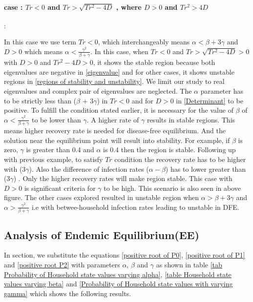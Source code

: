 \documentclass[paper=a4, fontsize=11pt, twoside, BCOR=12mm, parskip=full, listof=totoc]{scrreprt}
\begin{document}
{\paragraph*{case : $ Tr < 0$ and $Tr > \sqrt{Tr^2-4D} $ , where  $D > 0$ and $Tr^2 > 4D $}:

In this case we use term $ Tr < 0 $, which interchangeably means \( \alpha < \beta + 3\gamma \) and $ D > 0 $ which means \( \alpha < \frac{\gamma^2}{\beta + \gamma} \). In this case, when $ Tr < 0 $ and $Tr > \sqrt{Tr^2-4D} > 0$ with $D > 0$ and $ Tr^2-4D > 0 $, it shows the stable region because both eigenvalues   are negative in \ref{eigenvalue} and for other cases, it shows unstable regions in \ref{regions of stability and unstability}. We limit our study to real eigenvalues and complex pair of eigenvalues are neglected. The $\alpha$ parameter has to be strictly less than ($\beta$ + $3\gamma$) in $ Tr < 0$ and for $D > 0$ in \ref{Determinant} to be positive. To fulfill the condition stated earlier, it is necessary for the value of $\beta$  of \( \alpha < \frac{\gamma^2}{\beta + \gamma} \) to be lower than $\gamma$. A higher rate of $\gamma$ results in stable regions. This means higher recovery rate is needed for disease-free equilibrium. And the solution near the equilibrium point 
will result into stability. For example, if $\beta$ is zero, $\gamma$ is greater than 0.4 and $\alpha$ is 0.4 then the region is stable. Following up with previous example, to satisfy $Tr$ condition the recovery rate has to be higher with (3$\gamma$). Also the difference of infection rates ($\alpha - \beta$) has to lower greater than (3$\gamma$) . Only the higher recovery rates will make region stable. This case with $D > 0$ is significant criteria for $\gamma$ to be high. This scenario is also seen in above figure. 
The other cases explored resulted in unstable region when \( \alpha > \beta + 3\gamma \) and \( \alpha > \frac{\gamma^2}{\beta + \gamma} \) i.e with betwee-household infection rates leading to unstable in DFE.  

\subsection{Analysis of Endemic Equilibrium(EE)}
In section, we substitute the equations \ref{positive root of P0}, \ref{positive root of P1} and \ref{positive root P2} with parameters $\alpha$, $\beta$ and $\gamma$ as shown in table \ref{tab Probability of Household state values varying alpha}, \ref{table Household state values varying beta} and \ref{Probability of Household state values with varying gamma} which shows the following results. 

}
\end{document}
